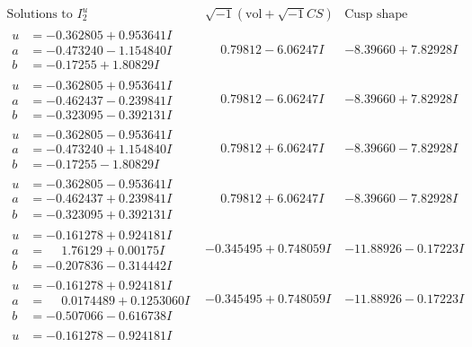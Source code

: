\documentclass[1p]{elsarticle_modified}
\theoremstyle{definition}
\newcommand{\I}{\sqrt{-1}}
\begin{document}
$$\begin{array}{c|c|c}  
\text{Solutions to }I^u_{2}& \I (\text{vol} + \sqrt{-1}CS) & \text{Cusp shape}\\
 \hline 
\begin{aligned}
u &= -0.362805 + 0.953641 I \\
a &= -0.473240 - 1.154840 I \\
b &= -0.17255 + 1.80829 I\end{aligned}
 & \phantom{-}0.79812 - 6.06247 I & -8.39660 + 7.82928 I \\ \hline\begin{aligned}
u &= -0.362805 + 0.953641 I \\
a &= -0.462437 - 0.239841 I \\
b &= -0.323095 - 0.392131 I\end{aligned}
 & \phantom{-}0.79812 - 6.06247 I & -8.39660 + 7.82928 I \\ \hline\begin{aligned}
u &= -0.362805 - 0.953641 I \\
a &= -0.473240 + 1.154840 I \\
b &= -0.17255 - 1.80829 I\end{aligned}
 & \phantom{-}0.79812 + 6.06247 I & -8.39660 - 7.82928 I \\ \hline\begin{aligned}
u &= -0.362805 - 0.953641 I \\
a &= -0.462437 + 0.239841 I \\
b &= -0.323095 + 0.392131 I\end{aligned}
 & \phantom{-}0.79812 + 6.06247 I & -8.39660 - 7.82928 I \\ \hline\begin{aligned}
u &= -0.161278 + 0.924181 I \\
a &= \phantom{-}1.76129 + 0.00175 I \\
b &= -0.207836 - 0.314442 I\end{aligned}
 & -0.345495 + 0.748059 I & -11.88926 - 0.17223 I \\ \hline\begin{aligned}
u &= -0.161278 + 0.924181 I \\
a &= \phantom{-}0.0174489 + 0.1253060 I \\
b &= -0.507066 - 0.616738 I\end{aligned}
 & -0.345495 + 0.748059 I & -11.88926 - 0.17223 I \\ \hline\begin{aligned}
u &= -0.161278 - 0.924181 I \\

\end{aligned}
\end{array}$$
\end{document}
